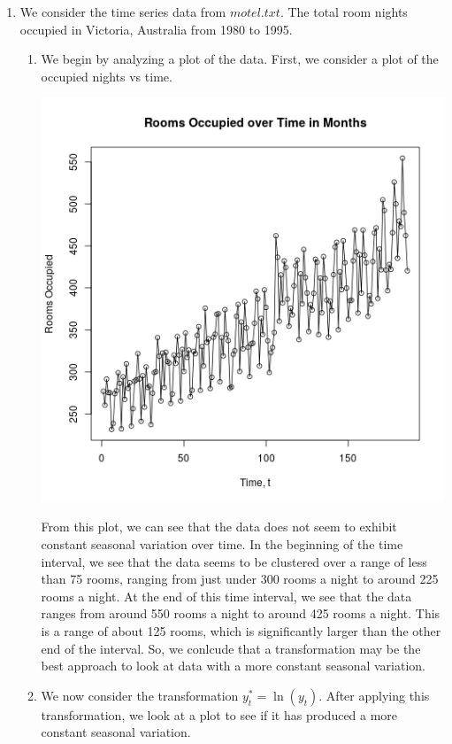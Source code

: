 \documentclass[letterpaper,10pt]{article}
\begin{document}
\begin{enumerate}
\item We consider the time series data from $motel.txt$. The total room nights occupied in Victoria, Australia from 1980 to 1995.
\begin{enumerate}
\item We begin by analyzing a plot of the data. First, we consider a plot of the occupied nights vs time.
\begin{center}
\includegraphics[scale=0.8]{motel.png}
\end{center}
From this plot, we can see that the data does not seem to exhibit constant seasonal variation over time. In the beginning of the time interval, we see that the data seems to be clustered over a range of less than 75 rooms, ranging from just under 300 rooms a night to around 225 rooms a night. At the end of this time interval, we see that the data ranges from around 550 rooms a night to around 425 rooms a night. This is a range of about 125 rooms, which is significantly larger than the other end of the interval. So, we conlcude that a transformation may be the best approach to look at data with a more constant seasonal variation.
\item We now consider the transformation $y^*_t=\ln(y_t)$. After applying this transformation, we look at a plot to see if it has produced a more constant seasonal variation.
\begin{center}

\end{center}
\end{enumerate}
\end{enumerate}
\end{document}
